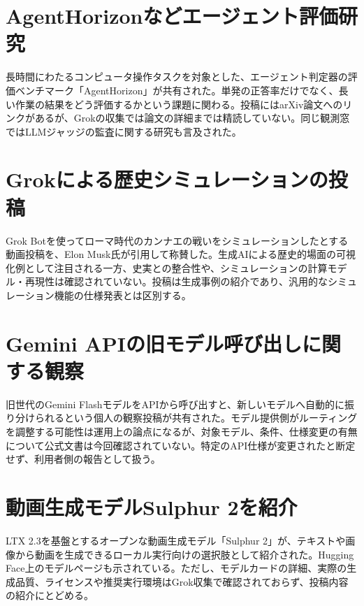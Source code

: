 \section{AgentHorizonなどエージェント評価研究}
長時間にわたるコンピュータ操作タスクを対象とした、エージェント判定器の評価ベンチマーク「AgentHorizon」が共有された。単発の正答率だけでなく、長い作業の結果をどう評価するかという課題に関わる。投稿にはarXiv論文へのリンクがあるが、Grokの収集では論文の詳細までは精読していない。同じ観測窓ではLLMジャッジの監査に関する研究も言及された。

\section{Grokによる歴史シミュレーションの投稿}
Grok Botを使ってローマ時代のカンナエの戦いをシミュレーションしたとする動画投稿を、Elon Musk氏が引用して称賛した。生成AIによる歴史的場面の可視化例として注目される一方、史実との整合性や、シミュレーションの計算モデル・再現性は確認されていない。投稿は生成事例の紹介であり、汎用的なシミュレーション機能の仕様発表とは区別する。

\section{Gemini APIの旧モデル呼び出しに関する観察}
旧世代のGemini FlashモデルをAPIから呼び出すと、新しいモデルへ自動的に振り分けられるという個人の観察投稿が共有された。モデル提供側がルーティングを調整する可能性は運用上の論点になるが、対象モデル、条件、仕様変更の有無について公式文書は今回確認されていない。特定のAPI仕様が変更されたと断定せず、利用者側の報告として扱う。

\section{動画生成モデルSulphur 2を紹介}
LTX 2.3を基盤とするオープンな動画生成モデル「Sulphur 2」が、テキストや画像から動画を生成できるローカル実行向けの選択肢として紹介された。Hugging Face上のモデルページも示されている。ただし、モデルカードの詳細、実際の生成品質、ライセンスや推奨実行環境はGrok収集で確認されておらず、投稿内容の紹介にとどめる。

